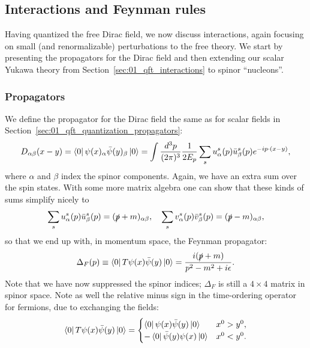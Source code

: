\subsection{Interactions and Feynman rules}
\label{sec:01_qft_spinors_feynman}

Having quantized the free Dirac field, we now discuss interactions, again focusing on small (and renormalizable) perturbations to the free theory.
We start by presenting the propagators for the Dirac field and then extending our scalar Yukawa theory from Section~\ref{sec:01_qft_interactions} to spinor ``nucleons''.

\subsubsection{Propagators}

We define the propagator for the Dirac field the same as for scalar fields in Section~\ref{sec:01_qft_quantization_propagators}:
\begin{equation}
	\label{eq:01_qft_spinors_propagator}
	D_{\alpha\beta}(x - y) = \bra{0}\psi(x)_\alpha\bar\psi(y)_\beta\ket{0} = \int \frac{d^3p}{(2\pi)^3} \frac{1}{2E_p} \sum_s u^s_\alpha(p) \bar u^s_\beta(p) e^{-ip\cdot(x - y)},
\end{equation}
where $\alpha$ and $\beta$ index the spinor components.
Again, we have an extra sum over the spin states.
With some more matrix algebra one can show that these kinds of sums simplify nicely to
\begin{equation}
	\label{eq:01_qft_spinors_uvsum}
	\sum_s u^s_\alpha(p) \bar u^s_\beta(p) = (\slashed{p} + m)_{\alpha\beta}, \quad \sum_s v^s_\alpha(p) \bar v^s_\beta(p) = (\slashed{p} - m)_{\alpha\beta},
\end{equation}
so that we end up with, in momentum space, the Feynman propagator:
\begin{equation}
	\label{eq:01_qft_spinors_propagator_momentum}
	\Delta_F(p) \equiv \bra{0}T\psi(x)\bar\psi(y)\ket{0} =  \frac{i(\slashed{p} + m)}{p^2 - m^2 + i\epsilon}.
\end{equation}
Note that we have now suppressed the spinor indices; $\Delta_F$ is still a $4\times4$ matrix in spinor space.
Note as well the relative minus sign in the time-ordering operator for fermions, due to exchanging the fields:
\begin{equation}
	\label{eq:01_qft_spinors_propagator_time_ordering}
	\bra{0}T\psi(x)\bar\psi(y)\ket{0} = \begin{cases} \bra{0}\psi(x)\bar\psi(y)\ket{0} & x^0 > y^0, \\ -\bra{0}\bar\psi(y)\psi(x)\ket{0} & x^0 < y^0. \end{cases}
\end{equation}

